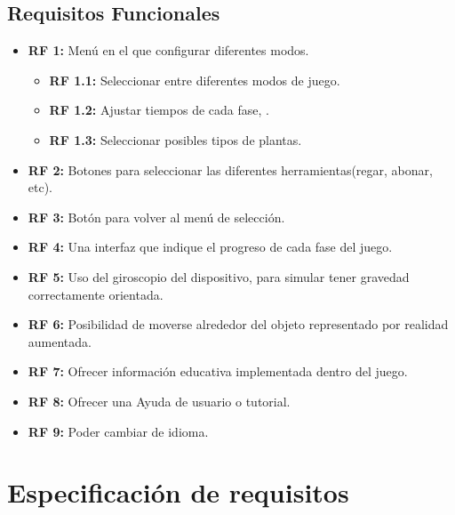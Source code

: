 \subsection{Requisitos Funcionales}
 \begin{itemize}
	\item \textbf{RF 1:} Menú en el que configurar diferentes modos.
	\begin{itemize}
	\item \textbf{RF 1.1:} Seleccionar entre diferentes modos de juego.
	\item \textbf{RF 1.2:} Ajustar tiempos de cada fase,  .
	\item \textbf{RF 1.3:} Seleccionar posibles tipos de plantas.	
	\end{itemize} 
	\item \textbf{RF 2:} Botones para seleccionar las diferentes herramientas(regar, abonar, etc).
	\item \textbf{RF 3:} Botón para volver al menú de selección.
	\item \textbf{RF 4:} Una interfaz que indique el progreso de cada fase del juego.
	\item \textbf{RF 5:} Uso del giroscopio del dispositivo, para simular tener gravedad correctamente orientada.
	\item \textbf{RF 6:} Posibilidad de moverse alrededor del objeto representado por realidad aumentada.
	\item \textbf{RF 7:} Ofrecer información educativa implementada dentro del juego.
	\item \textbf{RF 8:} Ofrecer una Ayuda de usuario o tutorial.
	\item \textbf{RF 9:} Poder cambiar de idioma.
\end{itemize}

\section{Especificación de requisitos}


